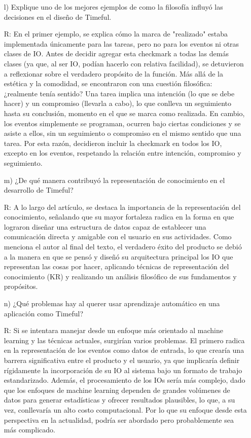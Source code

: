 \documentclass[11pt, letterpaper]{article}
\begin{document}
\begin{enumerate}
		
		\item[l)] Explique uno de los mejores ejemplos de como la filosofía influyó las decisiones en el diseño de Timeful.
		
		R:  En el primer ejemplo, se explica cómo la marca de "realizado" estaba implementada únicamente para las tareas, pero no para los eventos ni otras clases de IO. Antes de decidir agregar esta checkmark a todas las demás clases (ya que, al ser IO, podían hacerlo con relativa facilidad), se detuvieron a reflexionar sobre el verdadero propósito de la función. Más allá de la estética y la comodidad, se encontraron con una cuestión filosófica: ¿realmente tenía sentido? Una tarea implica una intención (lo que se debe hacer) y un compromiso (llevarla a cabo), lo que conlleva un seguimiento hasta su conclusión, momento en el que se marca como realizada. En cambio, los eventos simplemente se programan, ocurren bajo ciertas condiciones y se asiste a ellos, sin un seguimiento o compromiso en el mismo sentido que una tarea. Por esta razón, decidieron incluir la checkmark en todos los IO, excepto en los eventos, respetando la relación entre intención, compromiso y seguimiento.
		
		\item[m)]  ¿De qué manera contribuyó la representación de conocimiento en el desarrollo de Timeful?
		
		R: A lo largo del artículo, se destaca la importancia de la representación del conocimiento, señalando que su mayor fortaleza radica en la forma en que lograron diseñar una estructura de datos capaz de establecer una comunicación directa y amigable con el usuario en sus actividades. Como menciona el autor al final del texto, el verdadero éxito del producto se debió a la manera en que se pensó y diseñó su arquitectura principal los IO que representan las cosas por hacer, aplicando técnicas de representación del conocimiento (KR) y realizando un análisis filosófico de sus fundamentos y propósitos.
		
		\item[n)] ¿Qué problemas hay al querer usar aprendizaje automático en una aplicación como Timeful?
		
		R: Si se intentara manejar desde un enfoque más orientado al machine learning y las técnicas actuales, surgirían varios problemas. El primero radica en la representación de los eventos como datos de entrada, lo que crearía una barrera significativa entre el producto y el usuario, ya que implicaría definir rígidamente la incorporación de su IO al sistema bajo un formato de trabajo estandarizado. Además, el procesamiento de los IOs sería más complejo, dado que los enfoques de machine learning dependen de grandes volúmenes de datos para generar estadísticas y ofrecer resultados plausibles, lo que, a su vez, conllevaría un alto costo computacional. Por lo que su enfoque desde esta perspectiva en la actualidad, podría ser abordado pero probablemente sea más complicado.
		

\end{enumerate}
\end{document}
